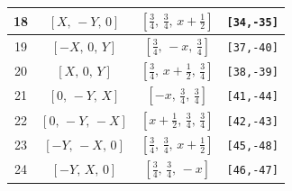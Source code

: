 \documentclass[fleqn,8pt]{jsarticle}
\begin{document}
\begin{longtable}{cccc}
18 & $\left[ X,\, - Y,\, 0 \right]$ & $\left[ \frac{3}{4},\, \frac{3}{4},\, x + \frac{1}{2} \right]$ & {\tt [34,-35]} \\ \hline
19 & $\left[ - X,\, 0,\, Y \right]$ & $\left[ \frac{3}{4},\, - x,\, \frac{3}{4} \right]$ & {\tt [37,-40]} \\ \hline
20 & $\left[ X,\, 0,\, Y \right]$ & $\left[ \frac{3}{4},\, x + \frac{1}{2},\, \frac{3}{4} \right]$ & {\tt [38,-39]} \\ \hline
21 & $\left[ 0,\, - Y,\, X \right]$ & $\left[ - x,\, \frac{3}{4},\, \frac{3}{4} \right]$ & {\tt [41,-44]} \\ \hline
22 & $\left[ 0,\, - Y,\, - X \right]$ & $\left[ x + \frac{1}{2},\, \frac{3}{4},\, \frac{3}{4} \right]$ & {\tt [42,-43]} \\ \hline
23 & $\left[ - Y,\, - X,\, 0 \right]$ & $\left[ \frac{3}{4},\, \frac{3}{4},\, x + \frac{1}{2} \right]$ & {\tt [45,-48]} \\ \hline
24 & $\left[ - Y,\, X,\, 0 \right]$ & $\left[ \frac{3}{4},\, \frac{3}{4},\, - x \right]$ & {\tt [46,-47]} \\
\end{longtable}
\renewcommand{\arraystretch}{1.2}
\end{document}
